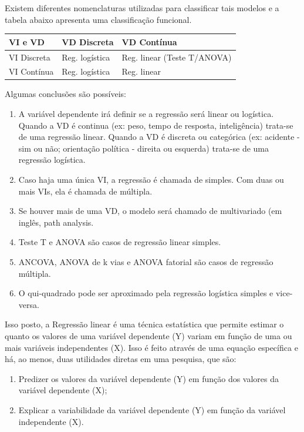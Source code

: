 \documentclass[
]{book}
\providecommand{\tightlist}{%
  \setlength{\itemsep}{0pt}\setlength{\parskip}{0pt}}
\begin{document}
Existem diferentes nomenclaturas utilizadas para classificar tais
modelos e a tabela abaixo apresenta uma classificação funcional.

\begin{longtable}[]{@{}lll@{}}
\toprule
VI e VD & VD Discreta & VD Contínua\tabularnewline
\midrule
\endhead
VI Discreta & Reg. logística & Reg. linear (Teste
T/ANOVA)\tabularnewline
VI Contínua & Reg. logística & Reg. linear\tabularnewline
\bottomrule
\end{longtable}

Algumas conclusões são possíveis:

\begin{enumerate}
\def\labelenumi{\arabic{enumi}.}
\tightlist
\item
  A variável dependente irá definir se a regressão será linear ou
  logística. Quando a VD é continua (ex: peso, tempo de resposta,
  inteligência) trata-se de uma regressão linear. Quando a VD é discreta
  ou categórica (ex: acidente - sim ou não; orientação política -
  direita ou esquerda) trata-se de uma regressão logística.\\
\item
  Caso haja uma única VI, a regressão é chamada de simples. Com duas ou
  mais VIs, ela é chamada de múltipla.\\
\item
  Se houver mais de uma VD, o modelo será chamado de multivariado (em
  inglês, path analysis.\\
\item
  Teste T e ANOVA são casos de regressão linear simples.\\
\item
  ANCOVA, ANOVA de k vias e ANOVA fatorial são casos de regressão
  múltipla.\\
\item
  O qui-quadrado pode ser aproximado pela regressão logística simples e
  vice-versa.
\end{enumerate}

Isso posto, a Regressão linear é uma técnica estatística que permite
estimar o quanto os valores de uma variável dependente (Y) variam em
função de uma ou mais variáveis independentes (X). Isso é feito através
de uma equação específica e há, ao menos, duas utilidades diretas em uma
pesquisa, que são:

\begin{enumerate}
\def\labelenumi{(\roman{enumi})}
\tightlist
\item
  Predizer os valores da variável dependente (Y) em função dos valores
  da variável dependente (X);\\
\item
  Explicar a variabilidade da variável dependente (Y) em função da
  variável independente (X).
\end{enumerate}
\end{document}
